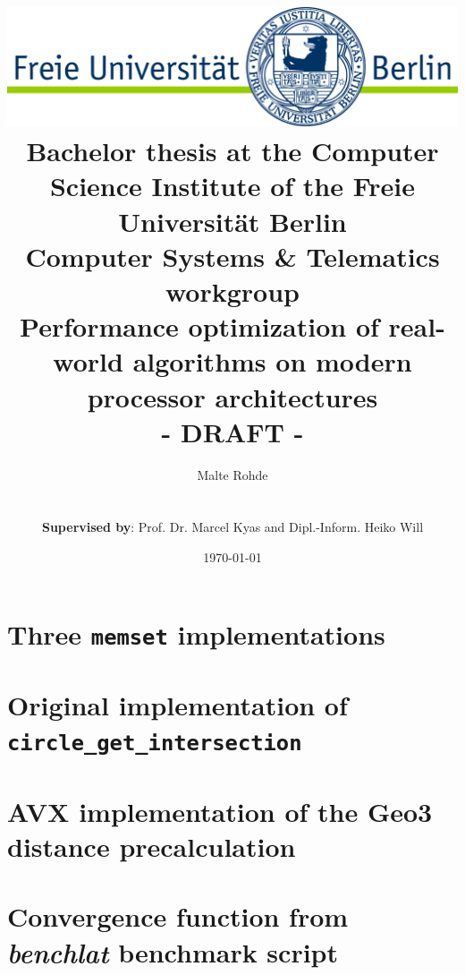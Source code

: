 \documentclass[a4paper,10pt]{article}
\title{\includegraphics[width=1.0\textwidth]{img/fulogo}\\[1.5cm]
{\normalsize Bachelor thesis at the Computer Science Institute of the Freie Universität Berlin\\ Computer Systems \& Telematics workgroup}\\[6ex] {\Huge Performance optimization of real-world algorithms on modern processor architectures\\[1cm]- DRAFT -}\\[6ex]}
\author{Malte Rohde\\
{\normalsize \mailto{malte.rohde@inf.fu-berlin.de}}\\\\
{\normalsize \textbf{Supervised by}: Prof. Dr. Marcel Kyas and Dipl.-Inform. Heiko Will}}
\date{\vspace*{1.0cm} \today{}}
\begin{document}
\begin{titlepage}

\maketitle
\thispagestyle{empty}

\vfill{}

\end{titlepage}

\pagestyle{empty}
\clearpage{}



\tableofcontents
\clearpage

\pagestyle{fancy}
\setcounter{page}{1}






\cleardoublepage
{}




\clearpage

\listoffigures
{}
\listoftables
\lstlistoflistings

\clearpage
\begin{appendices}
\section{Three \texttt{memset} implementations}
\label{memset_code}

\section{Original implementation of \texttt{circle\_get\_intersection}}
\label{scalarcircles}

\section{AVX implementation of the Geo3 distance precalculation}
\label{geodistancesavx}

\section{Convergence function from \emph{benchlat} benchmark script}
\label{convergence}

\end{appendices}
\end{document}
